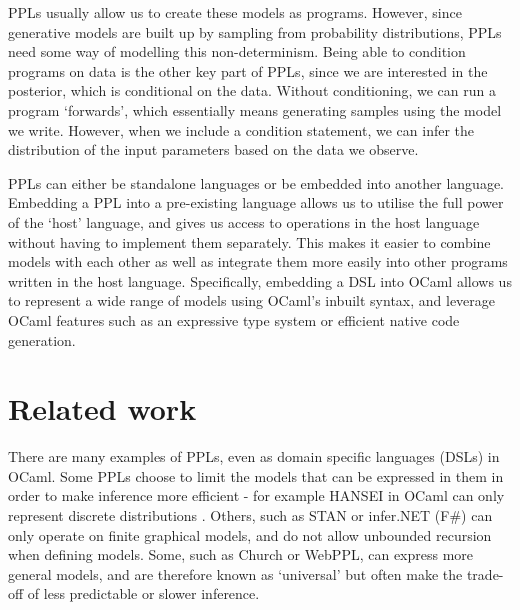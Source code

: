 PPLs usually allow us to create these models as programs. However, since generative models are built up by sampling from probability distributions, PPLs need some way of modelling this non-determinism. Being able to condition programs on data is the other key part of PPLs, since we are interested in the posterior, which is conditional on the data. Without conditioning, we can run a program `forwards', which essentially means generating samples using the model we write. However, when we include a condition statement, we can infer the distribution of the input parameters based on the data we observe.

PPLs can either be standalone languages or be embedded into another language. Embedding a PPL into a pre-existing language allows us to utilise the full power of the `host' language, and gives us access to operations in the host language without having to implement them separately. This makes it easier to combine models with each other as well as integrate them more easily into other programs written in the host language. Specifically, embedding a DSL into OCaml allows us to represent a wide range of models using OCaml's inbuilt syntax, and leverage OCaml features such as an expressive type system or efficient native code generation.

\section{Related work}
There are many examples of PPLs, even as domain specific languages (DSLs) in OCaml. Some PPLs choose to limit the models that can be expressed in them in order to make inference more efficient - for example HANSEI in OCaml can only represent discrete distributions \cite{kiselyov2009embedded}. Others, such as STAN or infer.NET (F\#) can only operate on finite graphical models, and do not allow unbounded recursion when defining models. Some, such as Church or WebPPL, can express more general models, and are therefore known as `universal' \cite{borgstrom2016lambda} but often make the trade-off of less predictable or slower inference.



